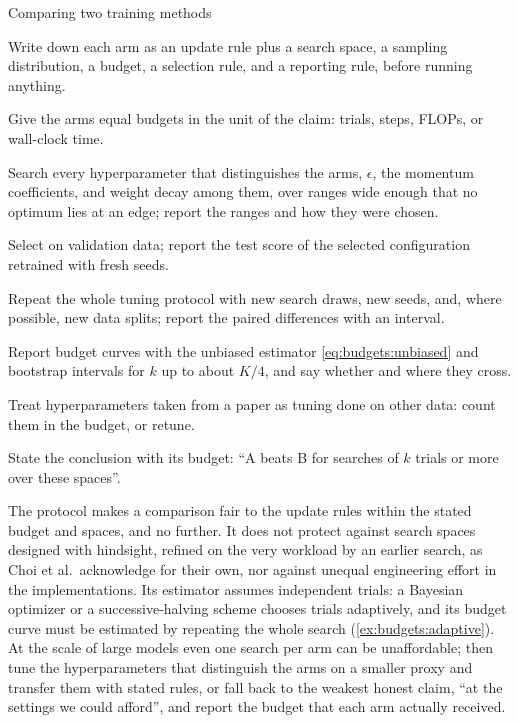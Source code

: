 \begin{refsection}
\begin{protocol}{Comparing two training methods}\label{prot:budgets:compare}
\item Write down each arm as an update rule plus a search space, a sampling distribution, a budget, a selection rule, and a reporting rule, before running anything.
\item Give the arms equal budgets in the unit of the claim: trials, steps, FLOPs, or wall-clock time.
\item Search every hyperparameter that distinguishes the arms, $\epsilon$, the momentum coefficients, and weight decay among them, over ranges wide enough that no optimum lies at an edge; report the ranges and how they were chosen.
\item Select on validation data; report the test score of the selected configuration retrained with fresh seeds.
\item Repeat the whole tuning protocol with new search draws, new seeds, and, where possible, new data splits; report the paired differences with an interval.
\item Report budget curves with the unbiased estimator \eqref{eq:budgets:unbiased} and bootstrap intervals for $k$ up to about $K/4$, and say whether and where they cross.
\item Treat hyperparameters taken from a paper as tuning done on other data: count them in the budget, or retune.
\item State the conclusion with its budget: \enquote{A beats B for searches of $k$ trials or more over these spaces}.
\end{protocol}

The protocol makes a comparison fair to the update rules within the stated budget and spaces, and no further. It does not protect against search spaces designed with hindsight, refined on the very workload by an earlier search, as Choi et al.\ acknowledge for their own, nor against unequal engineering effort in the implementations. Its estimator assumes independent trials: a Bayesian optimizer or a successive-halving scheme chooses trials adaptively, and its budget curve must be estimated by repeating the whole search (\cref{ex:budgets:adaptive}). At the scale of large models even one search per arm can be unaffordable; then tune the hyperparameters that distinguish the arms on a smaller proxy and transfer them with stated rules, or fall back to the weakest honest claim, \enquote{at the settings we could afford}, and report the budget that each arm actually received.


\end{refsection}
